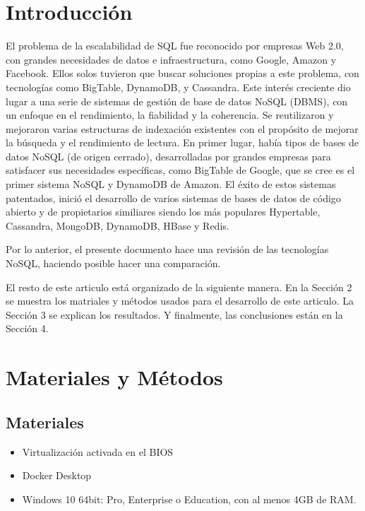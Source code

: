 \documentclass[%
 reprint,
 amsmath,amssymb,
 aps,
]{revtex4-1}
\begin{document}
\section {Introducción}\label{sec:1}

El problema de la escalabilidad de SQL fue reconocido por empresas Web 2.0, con grandes necesidades de datos e infraestructura, como Google, Amazon y Facebook. Ellos solos tuvieron que buscar soluciones propias a este problema, con tecnologías como BigTable, DynamoDB, y Cassandra.
Este interés creciente dio lugar a una serie de sistemas de gestión de base de datos NoSQL (DBMS), con un enfoque en el rendimiento, la fiabilidad y la coherencia. Se reutilizaron y mejoraron varias estructuras de indexación existentes con el propósito de mejorar la búsqueda y el rendimiento de lectura.
En primer lugar, había tipos de bases de datos NoSQL (de origen cerrado), desarrolladas por grandes empresas para satisfacer sus necesidades específicas, como BigTable de Google, que se cree es el primer sistema NoSQL y DynamoDB de Amazon.
El éxito de estos sistemas patentados, inició el desarrollo de varios sistemas de bases de datos de código abierto y de propietarios similiares siendo los más populares Hypertable, Cassandra, MongoDB, DynamoDB, HBase y Redis.

\par Por lo anterior, el presente documento hace una revisión de las tecnologías NoSQL, haciendo posible hacer una comparación.\\

\par El resto de este articulo está organizado de la siguiente manera. En la Sección 2 se muestra los matriales y métodos usados para el desarrollo de este articulo. La Sección 3 se explican los resultados. Y finalmente, las conclusiones están en la Sección 4.



\section{Materiales y Métodos}\label{sec:2}
\subsection{Materiales}
	\begin{itemize}
		\item Virtualización activada en el BIOS
		\item Docker Desktop
		\item Windows 10 64bit: Pro, Enterprise o Education, con al menos 4GB de RAM.
	\end{itemize}
\end{document}
